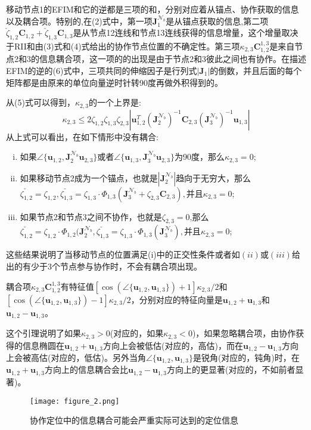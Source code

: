 \begin{remark}
移动节点1的EFIM和它的逆都是三项的和，分别对应着从锚点、协作获取的信息以及耦合项。特别的,在(2)式中，第一项$\bm{J}_1^{\mathcal{N}_b}$是从锚点获取的信息,第二项$\check{\zeta}_{1,2}\bm{C}_{1,2}+\check{\zeta}_{1,3}\bm{C}_{1,3}$是从节点12连线和节点13连线获得的信息增量，这个增量取决于RII和由(3)式和(4)式给出的协作节点位置的不确定性。第三项$\kappa_{2,3}\bm{C}_{1,2}^{1,3}$是来自节点2和3的信息耦合项，这一项的的出现是由于节点2和3彼此之间也有协作。在描述EFIM的逆的(6)式中，三项共同的伸缩因子是行列式$|\bm{J}_1|$的倒数，并且后面的每个矩阵都是由原来的单位向量逆时针转90度再做外积得到的。
\end{remark}
从(5)式可以得到，$\kappa_{2,3}$的一个上界是:
\[
\kappa_{2,3}\leq 2\zeta_{1,2}\zeta_{1,3}\zeta_{2,3}|\bm{u}_{1,2}^T(\bm{J}_2^{\mathcal{N}_b})^{-1}\bm{C}_{2,3}(\bm{J}_3^{\mathcal{N}_b})^{-1}\bm{u}_{1,3}|
\]
从上式可以看出，在如下情形中没有耦合:
\begin{enumerate}[(i)]
\item{如果$\angle \{\bm{u}_{1,2},\bm{J}_2^{\mathcal{N}_b}\bm{u}_{2,3}\}$或者$\angle \{\bm{u}_{1,3},\bm{J}_3^{\mathcal{N}_b}\bm{u}_{2,3}\}$为90度，那么$\kappa_{2,3}=0$;}
\item{如果移动节点2成为一个锚点，也就是$|\bm{J}_2^{\mathcal{N}_b}|$趋向于无穷大，那么$\check{\zeta_{1,2}}=\zeta_{1,2},\check{\zeta_{1,3}}=\zeta_{1,3}\cdot \Phi_{1,3}(\bm{J}_3^{\mathcal{N}_b}+\zeta_{2,3}\bm{C}_{2,3}),$并且$\kappa_{2,3}=0$;}
\item{如果节点2和节点3之间不协作，也就是$\zeta_{2,3}=0$,那么$\check{\zeta_{1,2}}=\zeta_{1,2}\cdot \Phi_{1,2}(\bm{J}_2^{\mathcal{N}_b},\check{\zeta_{1,3}}=\zeta_{1,3}\cdot \Phi_{1,3}(\bm{J}_3^{\mathcal{N}_b}),$并且$\kappa_{2,3}=0$;}
\end{enumerate}
这些结果说明了当移动节点的位置满足(i)中的正交性条件或者如$(ii)$或$(iii)$给出的有少于3个节点参与协作时，不会有耦合项出现。
\begin{corollary}
耦合项$\kappa_{2,3}\bm{C}_{1,2}^{1,3}$有特征值$[\cos(\angle \{\bm{u}_{1,2},\bm{u}_{1,3}\})+1]\kappa_{2,3}/2$和$[\cos(\angle \{\bm{u}_{1,2},\bm{u}_{1,3}\})-1]\kappa_{2,3}/2$，分别对应的特征向量是$
\bm{u}_{1,2}+\bm{u}_{1,3}$和$\bm{u}_{1,2}-\bm{u}_{1,3}$。
\end{corollary}
\begin{remark}
这个引理说明了如果$\kappa_{2,3}>0$(对应的，如果$\kappa_{2,3}<0$)，如果忽略耦合项，由协作获得的信息椭圆在$
\bm{u}_{1,2}+\bm{u}_{1,3}$方向上会被低估(对应的，高估)，而在$
\bm{u}_{1,2}-\bm{u}_{1,3}$方向上会被高估(对应的，低估)。另外当角$\angle \{\bm{u}_{1,2},\bm{u}_{1,3}\}$是锐角(对应的，钝角)时，在$
\bm{u}_{1,2}+\bm{u}_{1,3}$方向上的信息耦合会比$
\bm{u}_{1,2}-\bm{u}_{1,3}$方向上的更显著(对应的，不如前者显著)。
\end{remark}
\begin{figure}
\centering
\texttt{[image: figure\_2.png]}
\caption{协作定位中的信息耦合可能会严重实际可达到的定位信息}
\end{figure}


